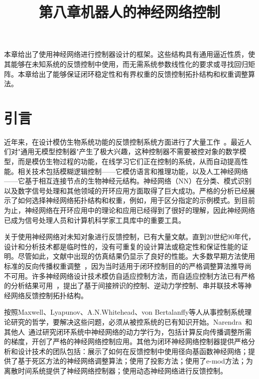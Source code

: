 \documentclass[12pt,a4paper]{ctexart}
\title{第八章\quad 机器人的神经网络控制}
\author{}
\date{}
\begin{document}
\maketitle

本章给出了使用神经网络进行控制器设计的框架。这些结构具有通用逼近性质，使其能够在未知系统的反馈控制中使用，而无需系统参数线性化的要求或寻找回归矩阵。本章给出了能够保证闭环稳定性和有界权重的反馈控制拓扑结构和权重调整算法。

\section{引言}

近年来，在设计模仿生物系统功能的反馈控制系统方面进行了大量工作~\cite{white1992,miller1991}。最近人们对"通用无模型控制器"产生了极大兴趣，这种控制器不需要被控对象的数学模型，而是模仿生物过程的功能，在线学习它们正在控制的系统，从而自动提高性能。相关技术包括模糊逻辑控制——它模仿语言和推理功能，以及人工神经网络——它基于相互连接节点的生物神经元结构。神经网络（NN）在分类、模式识别以及数字信号处理和其他领域的开环应用方面取得了巨大成功。严格的分析已经展示了如何选择神经网络拓扑结构和权重，例如，用于区分指定的示例模式。到目前为止，神经网络在开环应用中的理论和应用已经得到了很好的理解，因此神经网络已成为信号处理人员和计算机科学家工具库中的重要工具。

关于使用神经网络对未知对象进行反馈控制，已有大量文献。直到20世纪90年代，设计和分析技术都是临时性的，没有可重复的设计算法或稳定性和保证性能的证明。尽管如此，文献中出现的仿真结果仍显示了良好的性能。大多数早期方法使用标准的反向传播权重调整~\cite{werbos1992}，因为当时适用于闭环控制目的的严格调整算法推导尚不可用。许多神经网络设计技术模仿自适应控制方法，而自适应控制方法已有严格的分析结果可用~\cite{astrom1989,landau1979,goodwin1984}，提出了基于间接辨识的控制、逆动力学控制、串并联技术等神经网络反馈控制拓扑结构。

按照Maxwell、Lyapunov、A.N.Whitehead、von Bertalanffy等人从事控制系统理论研究的哲学，要解决这些问题，必须从被控系统的已有知识开始。Narendra~\cite{narendra1991,narendra1991b}和其他人~\cite{miller1991,white1992,werbos1992}通过研究闭环系统中神经网络的动力学行为，包括计算反向传播调整所需的梯度，开创了严格的神经网络控制应用。其他为闭环神经网络控制器提供严格分析和设计技术的团队包括：\cite{sanner1991}展示了如何在反馈控制中使用径向基函数神经网络；\cite{chen1992,chen1994}提供了基于死区方法的神经网络调整算法；\cite{polycarpou1991,polycarpou1996}使用了投影方法；\cite{lewis1993,lewis1995}使用了e-mod方法；\cite{sadegh1993}为离散时间系统提供了神经网络控制器；\cite{rovithakis1994}使用动态神经网络进行反馈控制。
\end{document}
